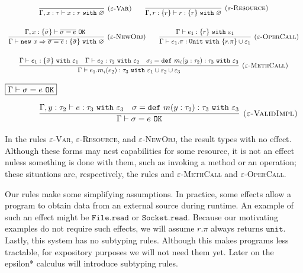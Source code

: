 \documentclass[a4paper,UKenglish]{lipics-v2016}
\newcommand{\kw}[1]{\mathtt{ #1 }~}
\newcommand{\kwa}[1]{\mathtt{ #1 }}
\newcommand{\newbasic}[0]{
	\kwa{new}~x \Rightarrow \overline{\sigma = e}
}
\begin{document}
\[
\begin{array}{c}
\infer[\textsc{($\varepsilon$-Var)}]
	{\Gamma, x:\tau \vdash x:\tau ~\kw{with} \varnothing}
	{}

~~~~~~

\infer[\textsc{($\varepsilon$-Resource)}]
	{\Gamma, r: \{r \} \vdash r : \{ r \} ~\kw{with} \varnothing}
	{}\\[4ex]
	
\infer[\textsc{($\varepsilon$-NewObj)}]
	{\Gamma \vdash \newbasic : \{ \bar \sigma \}~\kw{with} \varnothing}
	{\Gamma, x: \{ \bar \sigma \} \vdash \overline{\sigma = e}~\kw{OK}}
	
~~~~~~

\infer[\textsc{($\varepsilon$-OperCall)}]
	{\Gamma \vdash e_1.\pi : \kw{Unit} \kw{with} \{ r.\pi \} \cup \varepsilon_1 }
	{\Gamma \vdash e_1 : \{ r \}~\kw{with} \varepsilon_1} \\[4ex]
	
\infer[\textsc{($\varepsilon$-MethCall)}]
	{\Gamma \vdash e_1.m_i(e_2) : \tau_3~\kw{with} \varepsilon_1 \cup \varepsilon_2 \cup \varepsilon_3}
	{\Gamma \vdash e_1: \{ \bar \sigma \}~\kw{with} \varepsilon_1 & \Gamma \vdash e_2: \tau_2~\kw{with} \varepsilon_2 & \sigma_i = \kw{def} m_i(y: \tau_2): \tau_3~\kw{with} \varepsilon_3}
	
\end{array}
\]

\noindent
$\fbox{$\Gamma \vdash \sigma = e~ \kwa{OK}$}$

\[
\begin{array}{c}

~~~~~~~~~~~

\infer[\textsc{($\varepsilon$-ValidImpl)}]
	{\Gamma \vdash \sigma = e~\kwa{OK}}
	{\Gamma, y: \tau_2 \vdash e: \tau_3~\kw{with} \varepsilon_3 & \sigma = \kw{def} m(y: \tau_2):\tau_3 ~\kw{with} \varepsilon_3}

\end{array}
\]

\noindent
In the rules \textsc{$\varepsilon$-Var}, \textsc{$\varepsilon$-Resource}, and \textsc{$\varepsilon$-NewObj}, the result types with no effect. Although these forms may nest capabilities for some resource, it is not an effect nuless something is done with them, such as invoking a method or an operation; these situations are, respectively, the rules and \textsc{$\varepsilon$-MethCall} and \textsc{$\varepsilon$-OperCall}.

Our rules make some simplifying assumptions. In practice, some effects allow a program to obtain data from an external source during runtime. An example of such an effect might be $\kwa{File.read}$ or $\kwa{Socket.read}$. Because our motivating examples do not require such effects, we will assume $r.\pi$ always returns $\kwa{unit}$. Lastly, this system has no subtyping rules. Although this makes programs less tractable, for expository purposes we will not need them yet. Later on the epsilon* calculus will introduce subtyping rules.
\end{document}
